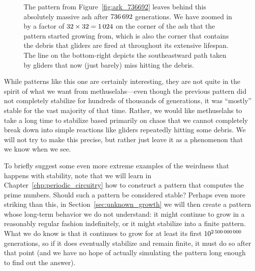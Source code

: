 \begin{figure}[!htb]
	
	\caption{The pattern from Figure~\ref{fig:ark_736692} leaves behind this absolutely massive ash after $736{\,}692$ generations. We have zoomed in by a factor of $32 \times 32 = 1{\,}024$ on the corner of the ash that the pattern started growing from, which is also the corner that contains the debris that gliders are fired at throughout its extensive lifespan. The  line on the bottom-right depicts the southeastward path taken by gliders that now (just barely) miss hitting the debris.}\label{fig:ark_736692_stabilized}
\end{figure}

While patterns like this one are certainly interesting, they are not quite in the spirit of what we want from methuselahs---even though the previous pattern did not completely stabilize for hundreds of thousands of generations, it was ``mostly'' stable for the vast majority of that time. Rather, we would like methuselahs to take a long time to stabilize based primarily on chaos that we cannot completely break down into simple reactions like gliders repeatedly hitting some debris. We will not try to make this precise, but rather just leave it as a phenomenon that we know when we see.

To briefly suggest some even more extreme examples of the weirdness that happens with stability, note that we will learn in Chapter~\ref{chp:periodic_circuitry} how to construct a pattern that computes the prime numbers. Should such a pattern be considered stable? Perhaps even more striking than this, in Section~\ref{sec:unknown_growth} we will then create a pattern whose long-term behavior we do not understand: it might continue to grow in a reasonably regular fashion indefinitely, or it might stabilize into a finite pattern. What we do know is that it continues to grow for at least its first $10^{2{\,}500{\,}000{\,}000}$ generations, so if it does eventually stabilize and remain finite, it must do so after that point (and we have no hope of actually simulating the pattern long enough to find out the answer).

